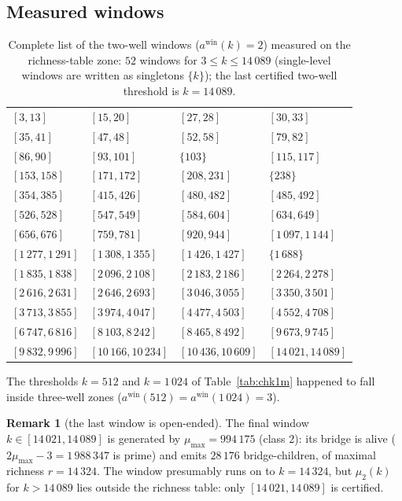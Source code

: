 \documentclass[11pt]{article}
\theoremstyle{plain}
\theoremstyle{definition}
\newtheorem{remark}[theorem]{Remark}
\begin{document}
\subsection{Measured windows}

\begin{table}[htbp]
\centering
\caption{Complete list of the two-well windows ($a^{\mathrm{win}}(k)=2$)
measured on the richness-table zone: $52$ windows for
$3 \le k \le 14\,089$ (single-level windows are written as
singletons $\{k\}$); the last certified two-well threshold is
$k = 14\,089$.}
\label{tab:windows}
\begin{tabular}{@{}llll@{}}
\toprule
$[3,13]$ & $[15,20]$ & $[27,28]$ & $[30,33]$\\
$[35,41]$ & $[47,48]$ & $[52,58]$ & $[79,82]$\\
$[86,90]$ & $[93,101]$ & $\{103\}$ & $[115,117]$\\
$[153,158]$ & $[171,172]$ & $[208,231]$ & $\{238\}$\\
$[354,385]$ & $[415,426]$ & $[480,482]$ & $[485,492]$\\
$[526,528]$ & $[547,549]$ & $[584,604]$ & $[634,649]$\\
$[656,676]$ & $[759,781]$ & $[920,944]$ & $[1\,097,1\,144]$\\
$[1\,277,1\,291]$ & $[1\,308,1\,355]$ & $[1\,426,1\,427]$ & $\{1\,688\}$\\
$[1\,835,1\,838]$ & $[2\,096,2\,108]$ & $[2\,183,2\,186]$ & $[2\,264,2\,278]$\\
$[2\,616,2\,631]$ & $[2\,646,2\,693]$ & $[3\,046,3\,055]$ & $[3\,350,3\,501]$\\
$[3\,713,3\,855]$ & $[3\,974,4\,047]$ & $[4\,477,4\,503]$ & $[4\,552,4\,708]$\\
$[6\,747,6\,816]$ & $[8\,103,8\,242]$ & $[8\,465,8\,492]$ & $[9\,673,9\,745]$\\
$[9\,832,9\,996]$ & $[10\,166,10\,234]$ & $[10\,436,10\,609]$ & $[14\,021,14\,089]$\\
\bottomrule
\end{tabular}
\end{table}

The thresholds $k = 512$ and $k = 1\,024$ of Table~\ref{tab:chk1m}
happened to fall inside three-well zones
($a^{\mathrm{win}}(512) = a^{\mathrm{win}}(1\,024) = 3$).

\begin{remark}[the last window is open-ended]\label{rem:lastwin}
The final window $k \in [14\,021, 14\,089]$ is generated by
$\mu_{\max} = 994\,175$ (class $2$): its bridge is alive
($2\mu_{\max} - 3 = 1\,988\,347$ is prime) and emits $28\,176$
bridge-children, of maximal richness $r = 14\,324$. The window
presumably runs on to $k = 14\,324$, but $\mu_2(k)$ for
$k > 14\,089$ lies outside the richness table: only
$[14\,021, 14\,089]$ is certified.
\end{remark}
\end{document}
